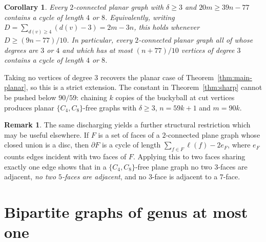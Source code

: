 \documentclass[11pt]{article}
\theoremstyle{plain}
\newtheorem{corollary}[theorem]{Corollary}
\theoremstyle{definition}
\newtheorem{remark}[theorem]{Remark}
\newcommand{\Cfour}{C_4}
\newcommand{\Ceight}{C_8}
\begin{document}
\begin{corollary}
Every $2$-connected planar graph with $\delta\ge3$ and $20m\ge39n-77$ contains a
cycle of length $4$ or $8$. Equivalently, writing $D=\sum_{d(v)\ge4}(d(v)-3)
=2m-3n$, this holds whenever $D\ge(9n-77)/10$. In particular, every
$2$-connected planar graph all of whose degrees are $3$ or $4$ and which has at
most $(n+77)/10$ vertices of degree $3$ contains a cycle of length $4$ or $8$.
\end{corollary}

Taking no vertices of degree $3$ recovers the planar case of
Theorem~\ref{thm:main-planar}, so this is a strict extension. The constant in
Theorem~\ref{thm:sharp} cannot be pushed below $90/59$: chaining $k$ copies of
the buckyball at cut vertices produces planar $\{\Cfour,\Ceight\}$-free graphs
with $\delta\ge3$, $n=59k+1$ and $m=90k$.

\begin{remark}
The same discharging yields a further structural restriction which may be useful
elsewhere. If $F$ is a set of faces of a $2$-connected plane graph whose closed
union is a disc, then $\partial F$ is a cycle of length
$\sum_{f\in F}\ell(f)-2e_F$, where $e_F$ counts edges incident with two faces of
$F$. Applying this to two faces sharing exactly one edge shows that in a
$\{\Cfour,\Ceight\}$-free plane graph no two $3$-faces are adjacent, \emph{no two
$5$-faces are adjacent}, and no $3$-face is adjacent to a $7$-face.
\end{remark}

\section{Bipartite graphs of genus at most one}
\end{document}
